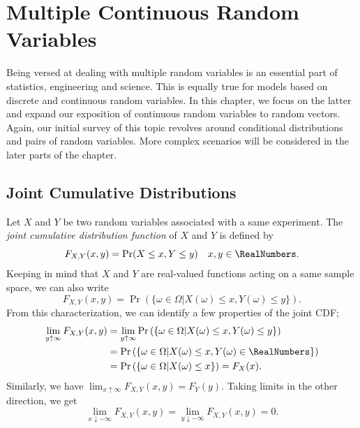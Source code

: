 \chapter[Continuous Random Vectors]{Multiple Continuous Random Variables}

Being versed at dealing with multiple random variables is an essential part of statistics, engineering and science.
This is equally true for models based on discrete and continuous random variables.
In this chapter, we focus on the latter and expand our exposition of continuous random variables to random vectors.
Again, our initial survey of this topic revolves around conditional distributions and pairs of random variables.
More complex scenarios will be considered in the later parts of the chapter.


\section{Joint Cumulative Distributions}

Let $X$ and $Y$ be two random variables associated with a same experiment.
The \emph{joint cumulative distribution function} of $X$ and $Y$ is defined by 
\begin{equation*}
F_{X,Y} (x, y) = \Pr (X \leq x, Y \leq y) \quad x, y \in \RealNumbers .
\end{equation*}
Keeping in mind that $X$ and $Y$ are real-valued functions acting on a same sample space, we can also write
\begin{equation*}
F_{X,Y} (x, y) = \Pr \left( \{ \omega \in \Omega | X(\omega) \leq x, Y(\omega) \leq y \} \right) .
\end{equation*}
From this characterization, we can identify a few properties of the joint CDF;
\begin{equation*}
\begin{split}
\lim_{y \uparrow \infty} F_{X,Y} (x, y)
&= \lim_{y \uparrow \infty} \Pr \left( \{ \omega \in \Omega | X(\omega) \leq x, Y(\omega) \leq y \} \right) \\
&= \Pr \left( \{ \omega \in \Omega | X(\omega) \leq x, Y(\omega) \in \RealNumbers \} \right) \\
&= \Pr \left( \{ \omega \in \Omega | X(\omega) \leq x \} \right)
= F_X (x) .
\end{split}
\end{equation*}
Similarly, we have $\lim_{x \uparrow \infty} F_{X,Y} (x,y) = F_Y (y)$.
Taking limits in the other direction, we get
\begin{equation*}
\lim_{x \downarrow -\infty} F_{X,Y} (x,y) 
= \lim_{y \downarrow -\infty} F_{X,Y} (x,y) = 0 .
\end{equation*}

